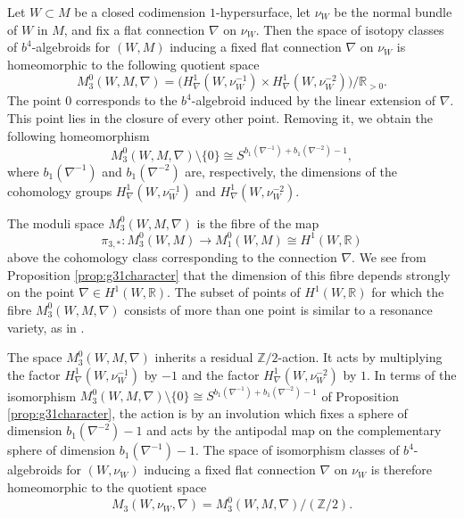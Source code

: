 \documentclass[10pt]{amsart}
\numberwithin{theoremalpha}{section}
\numberwithin{equation}{section}
\numberwithin{definition}{section}
\numberwithin{theorem}{section}
\numberwithin{proposition}{section}
\numberwithin{lemma}{section}
\numberwithin{example}{section}
\numberwithin{remark}{section}
\numberwithin{corollary}{section}
\numberwithin{question}{section}
\numberwithin{problem}{section}
\numberwithin{assumption}{section}
\theoremstyle{named}
\numberwithin{equation}{section}
\begin{document}
\begin{proposition} \label{prop:g31character}
Let $W \subset M$ be a closed codimension $1$-hypersurface, let $\nu_{W}$ be the normal bundle of $W$ in $M$, and fix a flat connection $\nabla$ on $\nu_W$. Then the space of isotopy classes of $b^4$-algebroids for $(W,M)$ inducing a fixed flat connection $\nabla$ on $\nu_W$ is homeomorphic to the following quotient space 
\[
M^0_{3}(W,M, \nabla) = \big( H^1_{\nabla}(W, \nu_W^{-1}) \times H^{1}_{\nabla}(W, \nu_W^{-2}) \big)/\mathbb{R}_{>0}. 
\]
The point $0$ corresponds to the $b^4$-algebroid induced by the linear extension of $\nabla$. This point lies in the closure of every other point. Removing it, we obtain the following homeomorphism
\[
M^0_{3}(W,M, \nabla)  \setminus \{ 0 \} \cong S^{b_1(\nabla^{-1}) + b_1(\nabla^{-2}) -1}, 
\]
where $b_1(\nabla^{-1}) $ and $b_1(\nabla^{-2})$ are, respectively, the dimensions of the cohomology groups $ H^1_{\nabla}(W, \nu_W^{-1}) $ and $ H^1_{\nabla}(W, \nu_W^{-2}) $. 
\end{proposition}
\begin{remark}
The moduli space $M^0_{3}(W,M, \nabla)$ is the fibre of the map 
\[
\pi_{3,*} : M_{3}^0(W, M) \to M_{1}^0(W, M) \cong H^{1}(W, \mathbb{R})
\]
above the cohomology class corresponding to the connection $\nabla$. We see from Proposition \ref{prop:g31character} that the dimension of this fibre depends strongly on the point $\nabla \in H^{1}(W, \mathbb{R})$. The subset of points of $H^{1}(W, \mathbb{R})$ for which the fibre $M^0_{3}(W,M, \nabla)$ consists of more than one point is similar to a resonance variety, as in \cite{falk1997arrangements}. 
\end{remark}

The space $M^0_{3}(W,M, \nabla)$ inherits a residual $\mathbb{Z}/2$-action. It acts by multiplying the factor $H^1_{\nabla}(W, \nu_W^{-1})$ by $-1$ and the factor $H^{1}_{\nabla}(W, \nu_W^{-2})$ by $1$. In terms of the isomorphism $M^0_{3}(W,M, \nabla)  \setminus \{ 0 \} \cong S^{b_1(\nabla^{-1}) + b_1(\nabla^{-2}) -1}$ of Proposition \ref{prop:g31character}, the action is by an involution which fixes a sphere of dimension $b_1(\nabla^{-2}) -1$ and acts by the antipodal map on the complementary sphere of dimension $b_1(\nabla^{-1}) -1$. The space of isomorphism classes of $b^4$-algebroids for $(W, \nu_W)$ inducing a fixed flat connection $\nabla$ on $\nu_W$ is therefore homeomorphic to the quotient space 
\[
M_{3}(W, \nu_W, \nabla) = M^0_{3}(W,M, \nabla)/(\mathbb{Z}/2).
\] 
\end{document}
